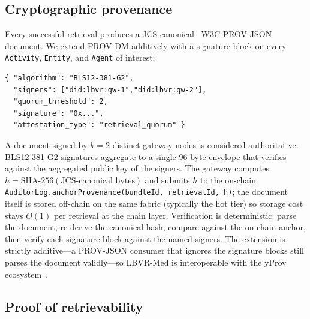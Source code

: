 \subsection{Cryptographic provenance}
\label{sec:protocol:provenance}

Every successful retrieval produces a JCS-canonical~\cite{rfc8785} W3C PROV-JSON~\cite{w3cprov} document. We extend PROV-DM additively with a signature block on every \texttt{Activity}, \texttt{Entity}, and \texttt{Agent} of interest:
\begin{lstlisting}[basicstyle=\ttfamily\scriptsize,frame=single]
{ "algorithm": "BLS12-381-G2",
  "signers": ["did:lbvr:gw-1","did:lbvr:gw-2"],
  "quorum_threshold": 2,
  "signature": "0x...",
  "attestation_type": "retrieval_quorum" }
\end{lstlisting}
A document signed by \(k = 2\) distinct gateway nodes is considered authoritative. BLS12-381 G2 signatures aggregate to a single 96-byte envelope that verifies against the aggregated public key of the signers. The gateway computes \(h = \text{SHA-256}(\text{JCS-canonical bytes})\) and submits \(h\) to the on-chain \texttt{AuditorLog.anchorProvenance(bundleId, retrievalId, h)}; the document itself is stored off-chain on the same fabric (typically the hot tier) so storage cost stays \(O(1)\) per retrieval at the chain layer. Verification is deterministic: parse the document, re-derive the canonical hash, compare against the on-chain anchor, then verify each signature block against the named signers. The extension is strictly additive---a PROV-JSON consumer that ignores the signature blocks still parses the document validly---so LBVR-Med is interoperable with the yProv ecosystem~\cite{manzi2025intertwin}.

\subsection{Proof of retrievability}
\label{sec:protocol:por}

